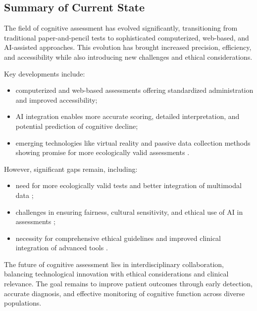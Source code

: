 \subsection{Summary of Current State}
The field of cognitive assessment has evolved significantly, transitioning from traditional paper-and-pencil tests to sophisticated computerized, web-based, and AI-assisted approaches. This evolution has brought increased precision, efficiency, and accessibility while also introducing new challenges and ethical considerations.

Key developments include:
\begin{itemize}
\item computerized and web-based assessments offering standardized administration and improved accessibility;
\item AI integration enables more accurate scoring, detailed interpretation, and potential prediction of cognitive decline;
\item emerging technologies like virtual reality and passive data collection methods showing promise for more ecologically valid assessments \cite{Parsons2018}.
\end{itemize}

However, significant gaps remain, including:
\begin{itemize}
\item need for more ecologically valid tests and better integration of multimodal data \cite{Parsons2021};
\item challenges in ensuring fairness, cultural sensitivity, and ethical use of AI in assessments \cite{Birhane2021};
\item necessity for comprehensive ethical guidelines and improved clinical integration of advanced tools \cite{Rudin2019}.
\end{itemize}

The future of cognitive assessment lies in interdisciplinary collaboration, balancing technological innovation with ethical considerations and clinical relevance. The goal remains to improve patient outcomes through early detection, accurate diagnosis, and effective monitoring of cognitive function across diverse populations.